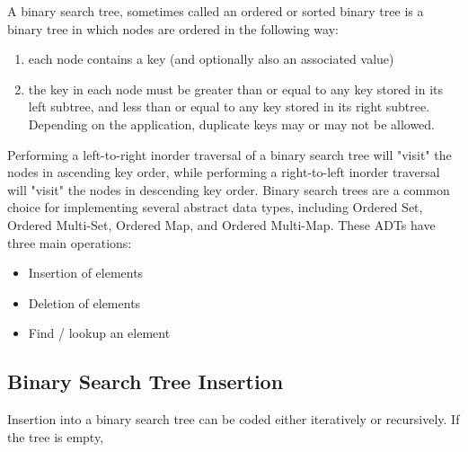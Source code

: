 \documentclass{report}
\begin{document}
    \pagebreak 
    \bigbreak \noindent 
    \begin{concept}
        A binary search tree, sometimes called an ordered or sorted binary tree is a binary tree in which nodes are ordered in the following way:
        \begin{enumerate}
            \item each node contains a key (and optionally also an associated value)
            \item the key in each node must be greater than or equal to any key stored in its left subtree, and less than or equal to any key stored in its right subtree. Depending on the application, duplicate keys may or may not be allowed.
        \end{enumerate}
    \end{concept}
    \bigbreak \noindent 
    Performing a left-to-right inorder traversal of a binary search tree will "visit" the nodes in ascending key order, while performing a right-to-left inorder traversal will "visit" the nodes in descending key order.
    \bigbreak \noindent 
    Binary search trees are a common choice for implementing several abstract data types, including Ordered Set, Ordered Multi-Set, Ordered Map, and Ordered Multi-Map. These ADTs have three main operations:
    \begin{itemize}
        \item Insertion of elements
        \item Deletion of elements
        \item Find / lookup an element
    \end{itemize}
    \bigbreak \noindent 
    \subsection{Binary Search Tree Insertion}
    \bigbreak \noindent 
    Insertion into a binary search tree can be coded either iteratively or recursively. If the tree is empty, 
    \bigbreak \noindent 
    \bigbreak \noindent 
\end{document}
